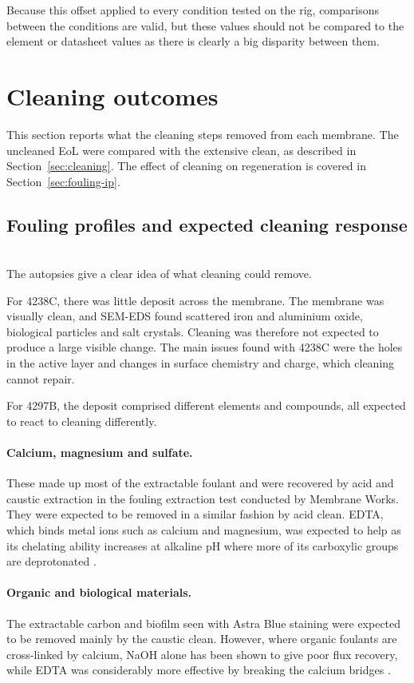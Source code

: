 Because this offset applied to every condition tested on the rig, comparisons between the conditions are valid, but these values should not be compared to the element or datasheet values as there is clearly a big disparity between them. 

\section{Cleaning outcomes}
\label{sec:res-cleaning}
This section reports what the cleaning steps removed from each membrane. The uncleaned EoL were compared with the extensive clean, as described in Section~\ref{sec:cleaning}. The effect of cleaning on regeneration is covered in Section~\ref{sec:fouling-ip}.

\subsection{Fouling profiles and expected cleaning response}
\\
The autopsies give a clear idea of what cleaning could remove.

For 4238C, there was little deposit across the membrane. The membrane was visually clean, and SEM-EDS found scattered iron and aluminium oxide, biological particles and salt crystals. Cleaning was therefore not expected to produce a large visible change. The main issues found with 4238C were the holes in the active layer and changes in surface chemistry and charge, which cleaning cannot repair.

For 4297B, the deposit comprised different elements and compounds, all expected to react to cleaning differently.
\paragraph{Calcium, magnesium and sulfate.} These made up most of the extractable foulant and were recovered by acid and caustic extraction in the fouling extraction test conducted by Membrane Works. They were expected to be removed in a similar fashion by acid clean. EDTA, which binds metal ions such as calcium and magnesium, was expected to help as its chelating ability increases at alkaline pH where more of its carboxylic groups are deprotonated \citep{elimelech2005chemical}.
\paragraph{Organic and biological materials.} The extractable carbon and biofilm seen with Astra Blue staining were expected to be removed mainly by the caustic clean. However, where organic foulants are cross-linked by calcium, NaOH alone has been shown to give poor flux recovery, while EDTA was considerably more effective by breaking the calcium bridges \cite{elimelech2005chemical}.
